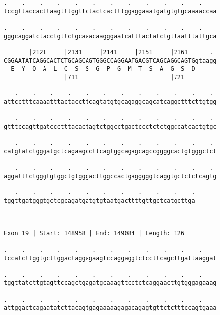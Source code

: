 \documentclass{article}
\begin{document}
\begin{Verbatim}
.    .    .    .    .    .    .    .    .    .    .    .    
tccgttaccacttaagtttggttctactcactttggaggaaatgatgtgtgcaaaaccaa
                                                            
.    .    .    .    .    .    .    .    .    .    .    .    
gggcaggatctacctgttctgcaaacaagggaatcatttactatctgttaatttattgca
                                                            
       |2121     |2131     |2141     |2151     |2161      . 
CGGAATATCAGGCACTCTGCAGCAGTGGGCCAGGAATGACGTCAGCAGGCAGTGgtaagg
  E  Y  Q  A  L  C  S  S  G  P  G  M  T  S  A  G  S  D      
                 |711                          |721         
  
   .    .    .    .    .    .    .    .    .    .    .    . 
attcctttcaaaatttactaccttcagtatgtgcagaggcagcatcaggctttcttgtgg
                                                            
   .    .    .    .    .    .    .    .    .    .    .    . 
gtttccagttgatccctttacactagtctggcctgactccctctctggccatcactgtgc
                                                            
   .    .    .    .    .    .    .    .    .    .    .    . 
catgtatctgggatgctcagaagccttcagtggcagagcagccggggcactgtgggctct
                                                            
   .    .    .    .    .    .    .    .    .    .    .    . 
aggatttctgggtgtggctgtgggacttggccactgagggggtcaggtgctctctcagtg
                                                            
   .    .    .    .    .    .    .    .    .    .    .
tggttgatgggtgctcgcagatgatgtgtaatgacttttgttgctcatgcttga
                                                      
                                                      
 
Exon 19 | Start: 148958 | End: 149084 | Length: 126
 
.    .    .    .    .    .    .    .    .    .    .    .    
tccatcttggtgcttggactaggagaagtccaggaggtctccttcagcttgattaaggat
                                                            
.    .    .    .    .    .    .    .    .    .    .    .    
tggttatcttgtagttccagctgagatgcaaagttcctctcaggaacttgtgggagaaag
                                                            
.    .    .    .    .    .    .    .    .    .    .    .    
attggactcagaatatcttacagtgagaaaaagagacagagtgttctctttccagtgaaa
                                                            

\end{Verbatim}
\end{document}

